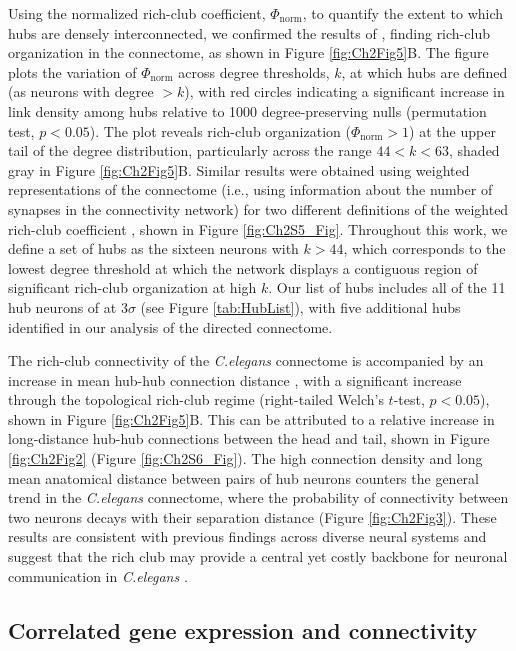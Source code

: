 Using the normalized rich-club coefficient, $\Phi_\mathrm{norm}$, to quantify the extent to which hubs are densely interconnected, we confirmed the results of  
\citet{Towlson2013}, finding rich-club organization in the connectome, as shown in Figure \ref{fig:Ch2Fig5}B.
The figure plots the variation of $\Phi_\mathrm{norm}$ across degree thresholds, $k$, at which hubs are defined (as neurons with degree $>k$), with red circles indicating a significant increase in link density among hubs relative to 1000 degree-preserving nulls (permutation test, $p < 0.05$).
The plot reveals rich-club organization ($\Phi_\mathrm{norm} > 1$) at the upper tail of the degree distribution, particularly across the range $44 < k < 63$, shaded gray in Figure \ref{fig:Ch2Fig5}B.
Similar results were obtained using weighted representations of the connectome (i.e., using information about the number of synapses in the connectivity network) for two different definitions of the weighted rich-club coefficient \citep{Opsahl2008}, shown in Figure \ref{fig:Ch2S5_Fig}.
Throughout this work, we define a set of hubs as the sixteen neurons with $k > 44$, which corresponds to the lowest degree threshold at which the network displays a contiguous region of significant rich-club organization at high $k$.
Our list of hubs includes all of the 11 hub neurons of \citet{Towlson2013} at $3 \sigma$ (see Figure \ref{tab:HubList}), with five additional hubs identified in our analysis of the directed connectome.

The rich-club connectivity of the \emph{C.elegans} connectome is accompanied by an increase in mean hub-hub connection distance \citep{Towlson2013}, with a significant increase through the topological rich-club regime (right-tailed Welch's $t$-test, $p < 0.05$), shown in Figure \ref{fig:Ch2Fig5}B.
This can be attributed to a relative increase in long-distance hub-hub connections between the head and tail, shown in Figure \ref{fig:Ch2Fig2} (Figure  \ref{fig:Ch2S6_Fig}).
The high connection density and long mean anatomical distance between pairs of hub neurons counters the general trend in the \emph{C.elegans} connectome, where the probability of connectivity between two neurons decays with their separation distance (Figure \ref{fig:Ch2Fig3}).
These results are consistent with previous findings across diverse neural systems and suggest that the rich club may provide a central yet costly backbone for neuronal communication in \emph{C.elegans} \citep{VandenHeuvel2012, Towlson2013}.

\subsection{Correlated gene expression and connectivity}

